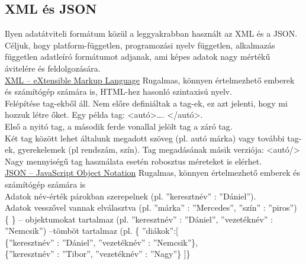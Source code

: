 \subsection{XML és JSON}
 Ilyen adatátviteli formátum közül a leggyakrabban használt az XML és a JSON. Céljuk, hogy platform-független, programozási nyelv független, alkalmazás független adatleíró formátumot adjanak, ami képes adatok nagy mértékű ávitelére és feldolgozására.
\newline
\\ \underline{XML – eXtensible Markup Language}
\vspace{10pt}
\newline \noindent Rugalmas, könnyen értelmezhető emberek és számítógép számára is, HTML-hez hasonló szintaxisú nyelv. 
\vspace{5pt}\\Felépítése tag-ekből áll. Nem előre definiáltak a tag-ek, ez azt jelenti, hogy mi hozzuk létre őket. Egy példa tag: <autó>…. </autó>.
\vspace{5pt}\\Első a nyitó tag, a második ferde vonallal jelölt tag a záró tag.
\\Két tag között lehet általunk megadott szöveg (pl. autó márka) vagy további tag-ek, gyerekelemek (pl rendszám, szín). Tag megadásának másik verziója: <autó/>
\vspace{5pt}\\Nagy mennyiségű tag használata esetén robosztus méreteket is elérhet.
\newline
\\ \underline{JSON – JavaScript Object Notation}
\vspace{10pt}
\newline \noindent Rugalmas, könnyen értelmezhető emberek és számítógép számára is
\\ Adatok név-érték párokban szerepelnek (pl. ”keresztnév” : ”Dániel”).
\\ Adatok vesszővel vannak elválasztva (pl. ”márka” : ”Mercedes”, ”szín” : ”piros”)
\\ \{ \} – objektumokat tartalmaz (pl. {”keresztnév” : ”Dániel”, ”vezetéknév” : ”Nemcsik”})
\newline [ ] –tömböt tartalmaz (pl. \{ ”diákok”:[
\\  \indent	\{”keresztnév” : ”Dániel”, ”vezetéknév” : ”Nemcsik”\},
\\  \indent \{”keresztnév” : ”Tibor”, ”vezetéknév” : ”Nagy”\}
]\}

